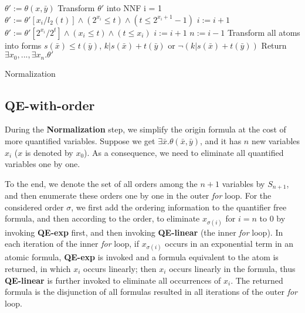 \begin{algorithm}[t]
    \SetAlgoLined
    
    $\theta' :=  \theta(x,\bar{y})$ \;
    Transform $\theta'$ into NNF\;
    i = 1\; 
    {
        $\theta' :=  \theta'[x_i/l_2(t)] \wedge (2^{x_i}\le t) \wedge (t\le 2^{x_i+1}-1)$\;
        $i:= i+1$\;
    }
    {
        $\theta' :=  \theta'[2^{x_i}/2^t]\wedge (x_i\le t) \wedge (t \le x_i)$\;
        $i:= i+1$\;
    }
    $n:= i-1$\;
    Transform all atoms into forms $s(\bar{x})\le t(\bar{y})$, $k|s(\bar{x})+t(\bar{y})$ or $\neg  (k|s(\bar{x})+t(\bar{y}))$\;
    Return $\exists x_0,...,\exists x_n. \theta'$
   
    \caption{Normalization}
\end{algorithm}


\subsection{QE-with-order} 
During the \textbf{Normalization} step, 
we simplify the origin formula at the cost of more quantified variables. 
Suppose we get $\exists \bar{x}.\theta(\bar{x},\bar{y})$,
and it has $n$ new variables $x_i$ ($x$ is denoted by $x_0$).
As a consequence, we need to eliminate all quantified variables one by one. 

To the end, we denote the set of all orders among the $n+1$ variables by 
 $S_{n+1}$, and then enumerate these orders one by one in the outer \textit{for} loop. 
 For the considered order $\sigma$, we first add the ordering information to 
 the quantifier free formula, and then according to the 
 order, to eliminate $x_{\sigma(i)}$ for $i=n$ to $0$ by invoking \textbf{QE-exp} first, and then invoking \textbf{QE-linear} (the inner \textit{for} loop). 
 In each iteration of the inner \textit{for} loop, 
if $x_{\sigma{(i)}}$ occurs in an exponential term in an atomic formula, 
\textbf{QE-exp} is invoked and a formula   equivalent to the atom is returned, in which $x_i$ occurs linearly;  
then $x_i$ occurs linearly in the formula, thus \textbf{QE-linear} is further invoked to eliminate all occurrences of $x_i$. 
The returned formula is the disjunction of all formulas resulted in all iterations of the outer \textit{for} loop. 
 

